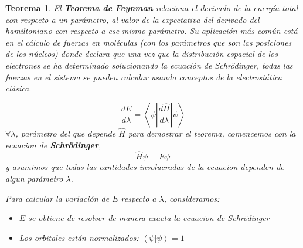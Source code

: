 \documentclass[a4paper]{IEEEtran} %
\newtheorem{teor}{Teorema}[section] %
\begin{document}
\begin{teor}
\rm %
\label{ejemplo_de_teorema_ejemplo_o_experimento_ecuaciones}
El \textbf{Teorema de Feynman} relaciona el derivado de la energía total con respecto a un parámetro, al valor de la expectativa del derivado del hamiltoniano con respecto a ese mismo parámetro. Su aplicación más común está en el cálculo de fuerzas en moléculas (con los parámetros que son las posiciones de los núcleos) donde declara que una vez que la distribución espacial de los electrones se ha determinado solucionando la ecuación de Schrödinger, todas las fuerzas en el sistema se pueden calcular usando conceptos de la electrostática clásica.

\begin{equation}
\frac{dE}{d \lambda} = \left\langle \psi \left| \frac{d \widehat{H}}{d \lambda} \right| \psi \right\rangle
\end{equation}
$\forall \lambda$, parámetro del que depende $\widehat{H}$
para demostrar el teorema, comencemos con la ecuacion de \textbf{Schrödinger},
\begin{equation*}
\widehat{H} \psi = E \psi
\end{equation*}
y asumimos que todas las cantidades involucradas de la ecuacion dependen de algun parámetro $\lambda$.

Para calcular la variación de $E$ respecto a $\lambda$, consideramos:

\begin{itemize}
\item $E$ se obtiene de resolver de manera exacta la ecuacion de Schrödinger
\item Los orbitales están normalizados: $\left\langle \psi | \psi \right\rangle= 1$
\end{itemize}


\end{teor}
\end{document}
